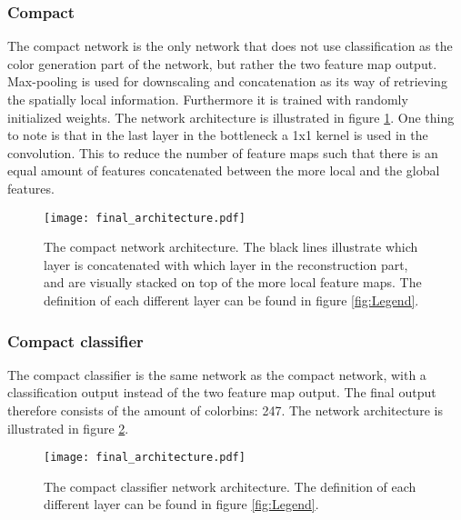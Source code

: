 \subsubsection{Compact}
The compact network is the only network that does not use classification as the color generation part of the network, but rather the two feature map output. Max-pooling is used for downscaling and concatenation as its way of retrieving the spatially local information. Furthermore it is trained with randomly initialized weights. The network architecture is illustrated in figure \ref{fig:compact}. One thing to note is that in the last layer in the bottleneck a 1x1 kernel is used in the convolution. This to reduce the number of feature maps such that there is an equal amount of features concatenated between the more local and the global features.
\begin{figure}[H]
	\centering
	\texttt{[image: final\_architecture.pdf]}
	\caption{The compact network architecture. The black lines illustrate which layer is concatenated with which layer in the reconstruction part, and are visually stacked on top of the more local feature maps. The definition of each different layer can be found in figure \ref{fig:Legend}.}
	\label{fig:compact}
\end{figure}

\subsubsection{Compact classifier}
The compact classifier is the same network as the compact network, with a classification output instead of the two feature map output. The final output therefore consists of the amount of colorbins: 247. The network architecture is illustrated in figure \ref{fig:compact_classifier}. 
\begin{figure}[H]
	\centering
	\texttt{[image: final\_architecture.pdf]}
	\caption{The compact classifier network architecture. The definition of each different layer can be found in figure \ref{fig:Legend}.}
	\label{fig:compact_classifier}
\end{figure}

